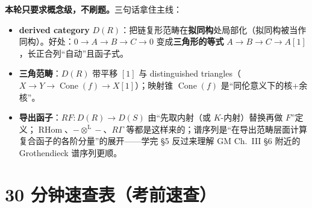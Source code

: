 \documentclass[12pt,a4paper]{ctexart}
\newcommand{\keypoint}{\text{\textbf{\ensuremath{\bigstar}}\;}}
\begin{document}
\textbf{本轮只要求概念级，不刷题。}三句话拿住主线：
\begin{itemize}
  \item \textbf{derived category} $D(R)$：把链复形范畴在\textbf{拟同构}处局部化（拟同构被当作同构）。好处：$0\to A\to B\to C\to0$ 变成\textbf{三角形的等式} $A\to B\to C\to A[1]$，长正合列“自动”且函子式。
  \item \textbf{三角范畴}：$D(R)$ 带平移 $[1]$ 与 distinguished triangles（$X\to Y\to\operatorname{Cone}(f)\to X[1]$）；映射锥 $\operatorname{Cone}(f)$ 是“同伦意义下的核+余核”。
  \item \textbf{导出函子}：$RF\colon D(R)\to D(S)$ 由“先取内射（或 $K$-内射）替换再做 $F$”定义；$\operatorname{RHom}$、$-\otimes^{\mathrm L}-$、$R\Gamma$ 等都是这样来的；\keypoint 谱序列是“在导出范畴层面计算复合函子的各阶分量”的展开——学完 \S5 反过来理解 GM Ch.~III \S6 附近的 Grothendieck 谱序列更顺。
\end{itemize}

\section{30 分钟速查表（考前速查）}
\end{document}
